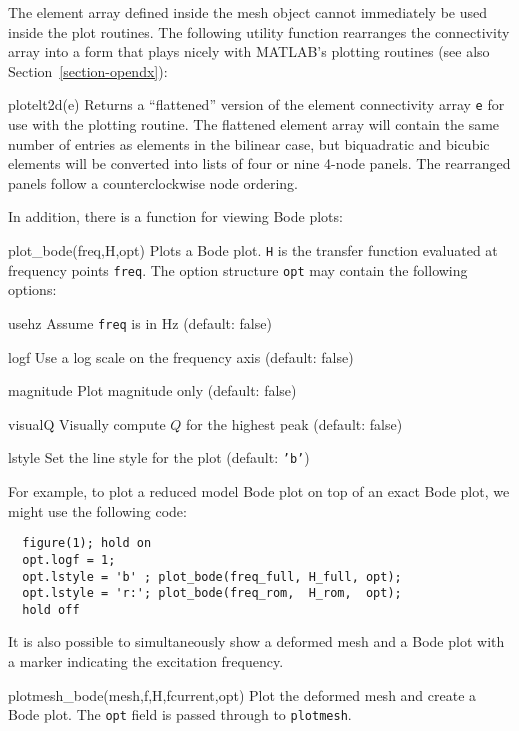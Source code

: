 \documentclass{article}
\newenvironment{codelist}[1][\quad]%
  {\begin{list}{}{%
   \settowidth{\labelwidth}{\texttt{#1}\hfil}%
   \setlength{\leftmargin}{\labelwidth}%
   \addtolength{\leftmargin}{\labelsep}%
   \addtolength{\leftmargin}{\parindent}%
   \renewcommand{\makelabel}[1]{\texttt{##1}}}}%
  {\end{list}}
\newcommand{\ttt}[1]{\texttt{#1}}
\begin{document}
The element array defined inside the mesh object cannot immediately be
used inside the plot routines.  The following utility function
rearranges the connectivity array into a form that plays nicely with
MATLAB's plotting routines (see also Section~\ref{section-opendx}):
\begin{codelist}

  \item[plotelt2d(e)]
    Returns a ``flattened'' version of the element connectivity array
    \ttt{e} for use with the plotting routine.  The flattened
    element array will contain the same number of entries as elements
    in the bilinear case, but biquadratic and bicubic elements will be
    converted into lists of four or nine 4-node panels.  The
    rearranged panels follow a counterclockwise node ordering.

\end{codelist}
In addition, there is a function for viewing Bode plots:
\begin{codelist}

  \item[plot\_bode(freq,H,opt)]
    Plots a Bode plot.  \ttt{H} is the transfer function evaluated
    at frequency points \ttt{freq}.  The option structure \ttt{opt}
    may contain the following options:
    \begin{codelist}[magnitude]
    \item[usehz]     Assume \ttt{freq} is in Hz (default: false)
    \item[logf]      Use a log scale on the frequency axis (default: false)
    \item[magnitude] Plot magnitude only (default: false)
    \item[visualQ]   Visually compute $Q$ for the highest peak (default: false)
    \item[lstyle]    Set the line style for the plot (default: \ttt{'b'})
    \end{codelist}
    For example, to plot a reduced model Bode plot on top of an exact
    Bode plot, we might use the following code:
    \begin{verbatim}
  figure(1); hold on
  opt.logf = 1;
  opt.lstyle = 'b' ; plot_bode(freq_full, H_full, opt);
  opt.lstyle = 'r:'; plot_bode(freq_rom,  H_rom,  opt);
  hold off
    \end{verbatim}

\end{codelist}
It is also possible to simultaneously show a deformed mesh and a Bode
plot with a marker indicating the excitation frequency.
\begin{codelist}
  \item[plotmesh\_bode(mesh,f,H,fcurrent,opt)]
    Plot the deformed mesh and create a Bode plot.  The \ttt{opt}
    field is passed through to \ttt{plotmesh}.
\end{codelist}
\end{document}
